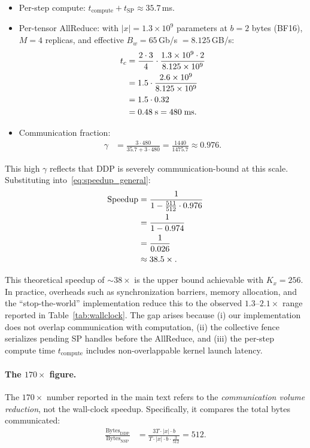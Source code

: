 \documentclass{article}
\begin{document}
\begin{itemize}
\item Per-step compute: $t_{\text{compute}} + t_{\text{SP}} \approx 35.7$\,ms.
\item Per-tensor AllReduce: with $|x| = 1.3 \times 10^9$ parameters at
  $b = 2$ bytes (BF16), $M = 4$ replicas, and effective $B_w = 65$\,Gb/s
  $= 8.125$\,GB/s:
\begin{align}
t_c
&= \frac{2 \cdot 3}{4} \cdot \frac{1.3 \times 10^9 \cdot 2}{8.125 \times 10^9}
\notag \\
&= 1.5 \cdot \frac{2.6 \times 10^9}{8.125 \times 10^9}
\notag \\
&= 1.5 \cdot 0.32
\notag \\
&= 0.48\;\text{s}
= 480\;\text{ms}.
\label{eq:tc_concrete}
\end{align}
\item Communication fraction:
\begin{align}
\gamma
&= \frac{3 \cdot 480}{35.7 + 3 \cdot 480}
= \frac{1440}{1475.7}
\approx 0.976.
\label{eq:gamma_concrete}
\end{align}
\end{itemize}

This high $\gamma$ reflects that DDP is severely communication-bound at
this scale. Substituting into~\eqref{eq:speedup_general}:
\begin{align}
\text{Speedup}
&= \frac{1}{1 - \frac{511}{512} \cdot 0.976}
\notag \\
&= \frac{1}{1 - 0.974}
\notag \\
&= \frac{1}{0.026}
\notag \\
&\approx 38.5\times.
\label{eq:speedup_concrete}
\end{align}

This theoretical speedup of $\sim 38\times$ is the upper bound achievable
with $K_x = 256$. In practice, overheads such as synchronization barriers,
memory allocation, and the ``stop-the-world'' implementation reduce this
to the observed $1.3$--$2.1\times$ range reported in Table~\ref{tab:wallclock}.
The gap arises because (i) our implementation does not overlap
communication with computation, (ii) the collective fence serializes
pending SP handles before the AllReduce, and (iii) the per-step compute
time $t_{\text{compute}}$ includes non-overlappable kernel launch latency.

\paragraph{The $170\times$ figure.}
The $170\times$ number reported in the main text refers to the
\emph{communication volume reduction}, not the wall-clock speedup.
Specifically, it compares the total bytes communicated:
\begin{align}
\frac{\text{Bytes}_{\text{DDP}}}{\text{Bytes}_{\text{NSP}}}
&= \frac{3T \cdot |x| \cdot b}
{T \cdot |x| \cdot b \cdot \frac{3}{512}}
= 512.
\label{eq:bytes_ratio}
\end{align}
\end{document}
